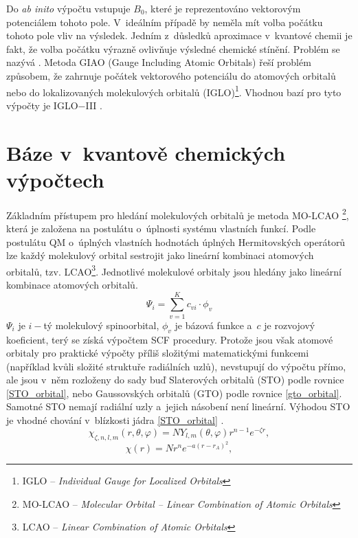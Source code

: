 \documentclass[
digital, %
table,   %
nolof,     %
nolot,     %
oneside,
]{fithesis3}
\begin{document}
Do \textit{ab inito} výpočtu vstupuje $B_0$, které je reprezentováno vektorovým potenciálem tohoto pole. V~ideálním případě by neměla mít volba počátku tohoto pole vliv na výsledek. Jedním z~důsledků aproximace v~kvantové chemii je fakt, že volba počátku výrazně ovlivňuje výsledné chemické stínění. Problém se nazývá . Metoda GIAO \cite{doi:10.1021/jp9529127} (Gauge  Including Atomic Orbitals) řeší problém způsobem, že zahrnuje počátek vektorového potenciálu do atomových orbitalů nebo do lokalizovaných molekulových orbitalů (IGLO)\footnote{IGLO -- \textit{Individual Gauge for Localized Orbitals}}. Vhodnou bazí pro tyto výpočty je IGLO$-$III \cite{Standara2006thesis, g09}.

\section{Báze v~kvantově chemických výpočtech}
Základním přístupem pro hledání molekulových orbitalů je metoda MO-LCAO \footnote{MO-LCAO -- \textit{Molecular Orbital – Linear Combination of Atomic Orbitals}}, která je založena na postulátu o~úplnosti systému vlastních funkcí. Podle postulátu QM o~úplných vlastních hodnotách úplných Hermitovských operátorů lze každý molekulový orbital sestrojit jako lineární kombinaci atomových orbitalů, tzv. LCAO\footnote{LCAO -- \textit{Linear Combination of Atomic Orbitals}}. Jednotlivé molekulové orbitaly jsou hledány jako lineární kombinace atomových orbitalů.
\begin{equation}
\Psi_i = \sum_{v=1}^{K}c_{vi} \cdot \phi_{v}
\end{equation}
$\Psi_i$ je $i-$tý molekulový spinoorbital, $\phi_{v}$ je bázová funkce a~$c$ je rozvojový koeficient, terý se získá výpočtem SCF procedury. Protože jsou však atomové orbitaly pro praktické výpočty příliš složitými matematickými funkcemi (například kvůli složité struktuře radiálních uzlů), nevstupují do výpočtu přímo, ale jsou v~něm rozloženy do sady buď Slaterových orbitalů (STO) podle rovnice \ref{STO_orbital}, nebo Gaussovských orbitalů (GTO) podle rovnice \ref{gto_orbital}. Samotné STO nemají radiální uzly a~jejich násobení není lineární. Výhodou STO je vhodné chování v~blízkosti jádra \ref{STO_orbital} \cite{jensen2007introduction}.
\begin{equation}
\chi_{\zeta, n, l, m}(r, \theta, \varphi) = NY_{l,m} (\theta, \varphi) r^{n-1} e^{-\zeta r},
\label{STO_orbital}
\end{equation}
\begin{equation}
\chi(r) = Nr^n e^{-a(r-r_A)^2},
\label{gto_orbital}
\end{equation}
\end{document}
